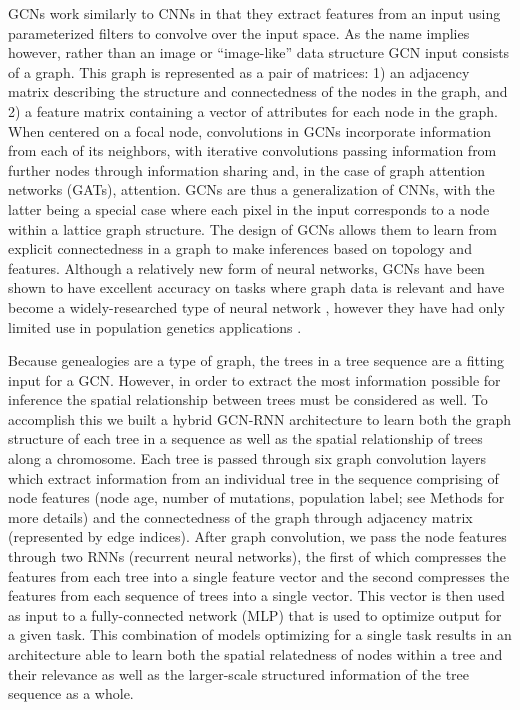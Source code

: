 GCNs work similarly to CNNs in that they extract features from an input using parameterized filters to convolve over the input space. As the name implies however, rather than an image or “image-like” data structure GCN input consists of a graph. This graph is represented as a pair of matrices: 1) an adjacency matrix describing the structure and connectedness of the nodes in the graph, and 2) a feature matrix containing a vector of attributes for each node in the graph. When centered on a focal node, convolutions in GCNs incorporate information from each of its neighbors, with iterative convolutions passing information from further nodes through information sharing and, in the case of graph attention networks (GATs), attention. GCNs are thus a generalization of CNNs, with the latter being a special case where each pixel in the input corresponds to a node within a lattice graph structure. The design of GCNs allows them to learn from explicit connectedness in a graph to make inferences based on topology and features. Although a relatively new form of neural networks, GCNs have been shown to have excellent accuracy on tasks where graph data is relevant and have become a widely-researched type of neural network \cite{zhouGraphNeuralNetworks2020}, however they have had only limited use in population genetics applications \cite{korfmannDeepLearningPopulation2023a,korfmannSimultaneousInferenceDemography2023}.

Because genealogies are a type of graph, the trees in a tree sequence are a fitting input for a GCN. However, in order to extract the most information possible for inference the spatial relationship between trees must be considered as well. To accomplish this we built a hybrid GCN-RNN architecture to learn both the graph structure of each tree in a sequence as well as the spatial relationship of trees along a chromosome. Each tree is passed through six graph convolution layers which extract information from an individual tree in the sequence comprising of node features (node age, number of mutations, population label; see Methods for more details) and the connectedness of the graph through adjacency matrix (represented by edge indices).   After graph convolution, we pass the node features through two RNNs (recurrent neural networks), the first of which compresses the features from each tree into a single feature vector and the second compresses the features from each sequence of trees into a single vector. This vector is then used as input to a fully-connected network (MLP) that is used to optimize output for a given task. This combination of models optimizing for a single task results in an architecture able to learn both the spatial relatedness of nodes within a tree and their relevance as well as the larger-scale structured information of the tree sequence as a whole.

